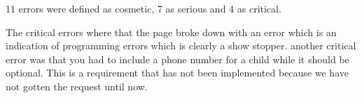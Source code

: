 11 errors were defined as cosmetic, 7 as serious and 4 as critical. 

The critical errors where that the page broke down with an error which is an indication of programming errors which is clearly a show stopper. another critical error was that you had to include a phone number for a child while it should be optional. This is a requirement that has not been implemented because we have not gotten the request until now.
